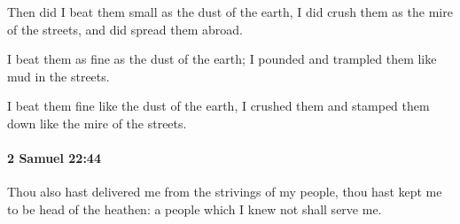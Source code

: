			\begin{versebox}
					\item[BHS] 
					\item[ASV] Then did I beat them small as the dust of the earth, I did crush them as the mire of the streets, and did spread them abroad.
					\item[NIV] I beat them as fine as the dust of the earth; I pounded and trampled them like mud in the streets.
					\item[NRSV] I beat them fine like the dust of the earth, I crushed them and stamped them down like the mire of the streets.
			\end{versebox}

		\paragraph{2 Samuel 22:44} %
			\label{2SAMUEL-22-44}

			Thou also hast delivered me from the strivings of my people, thou hast kept me to be head of the heathen: a people which I knew not shall serve me.

